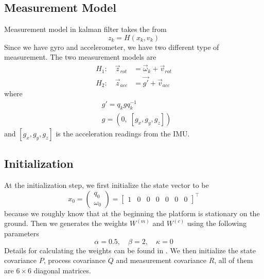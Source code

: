 \documentclass[twoside]{article}
\begin{document}
\begin{multicols}{2}
\subsection{Measurement Model}
Measurement model in kalman filter takes the from
\begin{equation}
z_k = H(x_k, v_k)
\end{equation}
Since we have gyro and accelerometer, we have two different type of measurement. The two measurement models are
\begin{align}
H_1: \quad \vec{z}_{rot} &= \vec{\omega}_k + \vec{v}_{rot} \\
H_2: \quad \vec{z}_{acc} &= \vec{g'} + \vec{v}_{acc} 
\end{align}
where
\begin{align}
&g' = q_k g q_k^{-1} \\
&g  = (0,\;[g_x,g_y,g_z])
\end{align}
and $[g_x,g_y,g_z]$ is the acceleration readings from the IMU.

\subsection{Initialization}
At the initialization step, we first initialize the state vector to be
\begin{equation}
x_0 = \begin{pmatrix}q_0 \\ \omega_0\end{pmatrix}
=\begin{bmatrix}
1 & 0 & 0 & 0 & 0 & 0 & 0
\end{bmatrix}^\top
\end{equation}
because we roughly know that at the beginning the platform is stationary on the ground. Then we generates the weights $W^{(m)}$ and $W^{(c)}$ using the following parameters
\begin{equation}
\alpha = 0.5, \quad \beta = 2, \quad \kappa = 0
\end{equation}
Details for calculating the weights can be found in \cite{Julier97}. We then initialize the state covariance $P$, process covariance $Q$ and measurement covariance $R$, all of them are $6\times6$ diagonal matrices.


\end{multicols}
\end{document}
